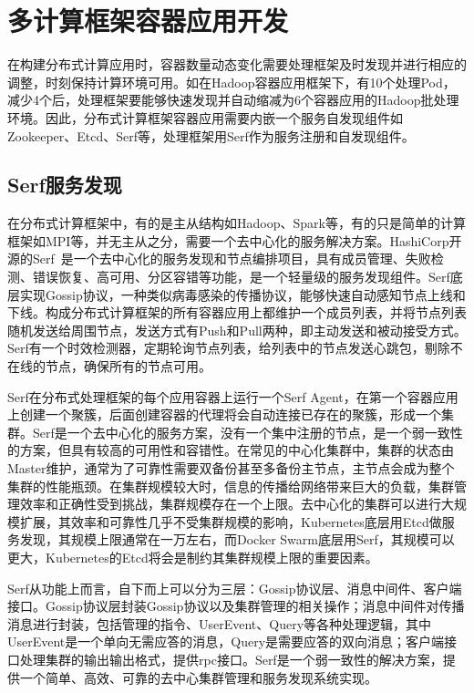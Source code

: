 \section{多计算框架容器应用开发}
在构建分布式计算应用时，容器数量动态变化需要处理框架及时发现并进行相应的调整，时刻保持计算环境可用。如在Hadoop容器应用框架下，有10个处理Pod，减少4个后，处理框架要能够快速发现并自动缩减为6个容器应用的Hadoop批处理环境。因此，分布式计算框架容器应用需要内嵌一个服务自发现组件如Zookeeper、Etcd、Serf等，处理框架用Serf作为服务注册和自发现组件。

\subsection{Serf服务发现}
在分布式计算框架中，有的是主从结构如Hadoop、Spark等，有的只是简单的计算框架如MPI等，并无主从之分，需要一个去中心化的服务解决方案。HashiCorp开源的Serf~\cite{Stubbs2015Distributed}是一个去中心化的服务发现和节点编排项目，具有成员管理、失败检测、错误恢复、高可用、分区容错等功能，是一个轻量级的服务发现组件。Serf底层实现Gossip协议，一种类似病毒感染的传播协议，能够快速自动感知节点上线和下线。构成分布式计算框架的所有容器应用上都维护一个成员列表，并将节点列表随机发送给周围节点，发送方式有Push和Pull两种，即主动发送和被动接受方式。Serf有一个时效检测器，定期轮询节点列表，给列表中的节点发送心跳包，剔除不在线的节点，确保所有的节点可用。

Serf在分布式处理框架的每个应用容器上运行一个Serf Agent，在第一个容器应用上创建一个聚簇，后面创建容器的代理将会自动连接已存在的聚簇，形成一个集群。Serf是一个去中心化的服务方案，没有一个集中注册的节点，是一个弱一致性的方案，但具有较高的可用性和容错性。在常见的中心化集群中，集群的状态由Master维护，通常为了可靠性需要双备份甚至多备份主节点，主节点会成为整个集群的性能瓶颈。在集群规模较大时，信息的传播给网络带来巨大的负载，集群管理效率和正确性受到挑战，集群规模存在一个上限。去中心化的集群可以进行大规模扩展，其效率和可靠性几乎不受集群规模的影响，Kubernetes底层用Etcd做服务发现，其规模上限通常在一万左右，而Docker Swarm底层用Serf，其规模可以更大，Kubernetes的Etcd将会是制约其集群规模上限的重要因素。

Serf从功能上而言，自下而上可以分为三层：Gossip协议层、消息中间件、客户端接口。Gossip协议层封装Gossip协议以及集群管理的相关操作；消息中间件对传播消息进行封装，包括管理的指令、UserEvent、Query等各种处理逻辑，其中UserEvent是一个单向无需应答的消息，Query是需要应答的双向消息；客户端接口处理集群的输出输出格式，提供rpc接口。Serf是一个弱一致性的解决方案，提供一个简单、高效、可靠的去中心集群管理和服务发现系统实现。

